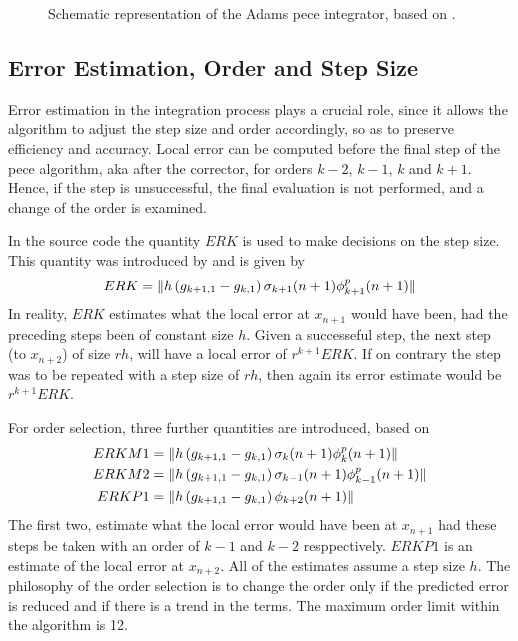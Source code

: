 \begin{figure}
  \centering
  
  \caption{Schematic representation of the Adams \gls{pece} integrator, based 
    on \cite{Shampine1975}.}
  \label{fig:adams-pece}
\end{figure}

\subsection{Error Estimation, Order and Step Size}\label{ssec:integrator-error-estimation}
Error estimation in the integration process plays a crucial role, since it allows 
the algorithm to adjust the step size and order accordingly, so as to preserve 
efficiency and accuracy. Local error can be computed before the final step of the 
\gls{pece} algorithm, aka after the corrector, for orders $k-2$, $k-1$, $k$ and 
$k+1$. Hence, if the step is unsuccessful, the final evaluation is not performed, 
and a change of the order is examined.

In the source code the quantity $ERK$ is used to make decisions on the step size. 
This quantity was introduced by \cite{Shampine1975} and is given by
\begin{equation}
  ERK = \lVert h \left( g_{k+1,1} - g_{k,1} \right) \sigma _{k+1}(n+1) \phi ^{p}_{k+1}(n+1)\rVert
\end{equation}
In reality, $ERK$ estimates what the local error at $x_{n+1}$ would have been, 
had the preceding steps been of constant size $h$. Given a successeful step, the 
next step (to $x_{n+2}$) of size $rh$, will have a local error of $r^{k+1} ERK$. 
If on contrary the step was to be repeated with a step size of $rh$, then again 
its error estimate would be $r^{k+1} ERK$.

For order selection, three further quantities are introduced, based on \cite{Shampine1975}
\begin{align}
  ERKM1 &= \lVert h \left( g_{k+1,1} - g_{k,1} \right) \sigma _{k}(n+1) \phi ^{p}_{k}(n+1)\rVert \\
  ERKM2 &= \lVert h \left( g_{k+1,1} - g_{k,1} \right) \sigma _{k-1}(n+1) \phi ^{p}_{k-1}(n+1)\rVert\\
  ERKP1 &= \lVert h \left( g_{k+1,1} - g_{k,1} \right) \phi _{k+2}(n+1)\rVert
\end{align}
The first two, estimate what the local error would have been at $x_{n+1}$ had these 
steps be taken with an order of $k-1$ and $k-2$ resppectively. $ERKP1$ is an estimate 
of the local error at $x_{n+2}$. All of the estimates assume a step size $h$. 
The philosophy of the order selection is to change the order only if the predicted 
error is reduced and if there is a trend in the terms. The maximum order limit 
within the algorithm is 12.

